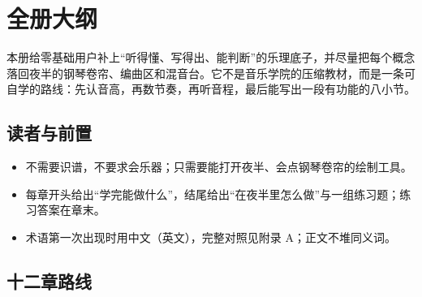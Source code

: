 \section*{全册大纲}

本册给零基础用户补上“听得懂、写得出、能判断”的乐理底子，并尽量把每个概念落回夜半的钢琴卷帘、编曲区和混音台。它不是音乐学院的压缩教材，而是一条可自学的路线：先认音高，再数节奏，再听音程，最后能写出一段有功能的八小节。

\subsection*{读者与前置}

\begin{itemize}
  \item 不需要识谱，不要求会乐器；只需要能打开夜半、会点钢琴卷帘的绘制工具。
  \item 每章开头给出“学完能做什么”，结尾给出“在夜半里怎么做”与一组练习题；练习答案在章末。
  \item 术语第一次出现时用中文（英文），完整对照见附录 A；正文不堆同义词。
\end{itemize}

\subsection*{十二章路线}

